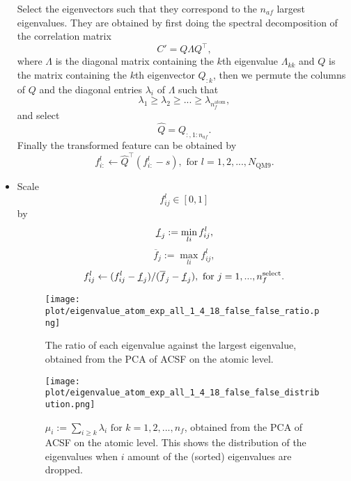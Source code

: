 \documentclass[12pt]{article}
\begin{document}
\begin{itemize}
	Select the eigenvectors such that they correspond to the $n_{af}$ largest eigenvalues. They are obtained by first doing the spectral decomposition of the correlation matrix
	\begin{equation}
		C' = Q\Lambda Q^\top,
	\end{equation}
	where $\Lambda$ is the diagonal matrix containing the $k$th eigenvalue $\Lambda_{kk}$ and $Q$ is the matrix containing the $k$th eigenvector $Q_{:k}$, then we permute the columns of $Q$ and the diagonal entries $\lambda_i$ of $\Lambda$ such that
	\begin{equation}
		\lambda_{1} \geq \lambda_{2} \geq  ... \geq \lambda_{n^\text{atom}_f},
	\end{equation}
	and select
	\begin{equation}
		\hat{Q} = Q_{:, 1:n_{af}}.
	\end{equation}
	Finally the transformed feature can be obtained by
	\begin{equation}
		\label{eq:pca_atom_end}
		f^l_{i:} \leftarrow \hat{Q}^\top(f^l_{i:} - s), \text{ for }l = 1,2,...,N_\text{QM9}.
	\end{equation}
	\item Scale
	\begin{equation}
		\label{eq:scale_1}
		f^l_{ij} \in [0, 1]
	\end{equation}
	by
	\begin{equation}
		\underbar{$f$}_j := \min_{li} f^l_{ij},
	\end{equation}
	\begin{equation}
		\overline{f}_j := \max_{li} f^l_{ij},
	\end{equation}
	\begin{equation}
		f^l_{ij} \leftarrow (f^l_{ij} - \underbar{$f$}_j)/ (\overline{f}_j - \underbar{$f$}_j), \text{ for } j = 1,..., n_f^\text{select}.
	\end{equation}
	\begin{figure}[H]
		\label{fig:PCA_atom_rat}
		\centering
		\texttt{[image: plot/eigenvalue\_atom\_exp\_all\_1\_4\_18\_false\_false\_ratio.png]}
		\caption{The ratio of each eigenvalue against the largest eigenvalue, obtained from the PCA of ACSF on the atomic level.}
	\end{figure}
	\begin{figure}[H]
		\label{fig:PCA_atom_dist}
		\centering
		\texttt{[image: plot/eigenvalue\_atom\_exp\_all\_1\_4\_18\_false\_false\_distribution.png]}
		\caption{$\mu_i := \sum_{i\geq k} \lambda_i \text{ for } k = 1,2,...,n_f$, obtained from the PCA of ACSF on the atomic level. This shows the distribution of the eigenvalues when $i$ amount of the (sorted) eigenvalues are dropped.}
	\end{figure}
\end{itemize}
\end{document}
